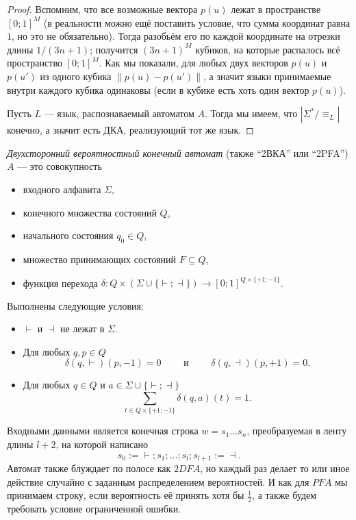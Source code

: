 \documentclass[12pt,a4paper]{article}
\begin{document}
\begin{proof}
        Вспомним, что все возможные вектора $p(u)$ лежат в пространстве $[0; 1]^M$ (в реальности можно ещё поставить условие, что сумма координат равна $1$, но это не обязательно). Тогда разобьём его по каждой координате на отрезки длины $1/(3n+1)$; получится $(3n+1)^M$ кубиков, на которые распалось всё пространство $[0; 1]^M$. Как мы показали, для любых двух векторов $p(u)$ и $p(u')$ из одного кубика $\|p(u) - p(u')\|$, а значит языки принимаемые внутри каждого кубика одинаковы (если в кубике есть хоть один вектор $p(u)$).

        Пусть $L$ --- язык, распознаваемый автоматом $A$. Тогда мы имеем, что $|\Sigma^*/{\equiv_L}|$ конечно, а значит есть ДКА, реализующий тот же язык.
    \end{proof}

    \begin{definition}
        \emph{Двухсторонний вероятностный конечный автомат} (также ``2ВКА'' или ``2PFA'') $A$ --- это совокупность
        \begin{itemize}
            \item входного алфавита $\Sigma$,
            \item конечного множества состояний $Q$,
            \item начального состояния $q_0 \in Q$,
            \item множество принимающих состояний $F \subseteq Q$,
            \item функция перехода $\delta: Q \times (\Sigma \cup \{\vdash; \dashv\}) \to [0; 1]^{Q \times \{+1; -1\}}$.
        \end{itemize}
        Выполнены следующие условия:
        \begin{itemize}
            \item $\vdash$ и $\dashv$ не лежат в $\Sigma$.
            \item Для любых $q, p \in Q$
                \[
                    \delta(q, \vdash)(p, -1) = 0
                    \qquad \text{ и } \qquad
                    \delta(q, \dashv)(p, +1) = 0.
                \]
            \item Для любых $q \in Q$ и $a \in \Sigma \cup \{\vdash; \dashv\}$ 
                \[\sum_{t \in Q \times \{+1; -1\}} \delta(q, a)(t) = 1.\]
        \end{itemize}
        Входными данными является конечная строка $w = s_1 \dots s_n$, преобразуемая в ленту длины $l+2$, на которой написано
        \[s_0 := \vdash; s_1; \dots; s_l; s_{l+1} := \dashv.\]
        Автомат также блуждает по полосе как $2DFA$, но каждый раз делает то или иное действие случайно с заданным распределением вероятностей. И как для $PFA$ мы принимаем строку, если вероятность её принять хотя бы $\frac{1}{2}$, а также будем требовать условие ограниченной ошибки.
    \end{definition}
\end{document}
